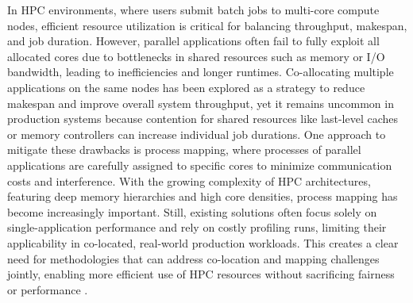 In HPC environments, where users submit batch jobs to multi-core compute nodes, efficient resource utilization is critical for balancing throughput, makespan, and job duration. However, parallel applications often fail to fully exploit all allocated cores due to bottlenecks in shared resources such as memory or I/O bandwidth, leading to inefficiencies and longer runtimes. Co-allocating multiple applications on the same nodes has been explored as a strategy to reduce makespan and improve overall system throughput, yet it remains uncommon in production systems because contention for shared resources like last-level caches or memory controllers can increase individual job durations. One approach to mitigate these drawbacks is process mapping, where processes of parallel applications are carefully assigned to specific cores to minimize communication costs and interference. With the growing complexity of HPC architectures, featuring deep memory hierarchies and high core densities, process mapping has become increasingly important. Still, existing solutions often focus solely on single-application performance and rely on costly profiling runs, limiting their applicability in co-located, real-world production workloads. This creates a clear need for methodologies that can address co-location and mapping challenges jointly, enabling more efficient use of HPC resources without sacrificing fairness or performance \cite{10.1007/978-3-031-48803-0_31}.

